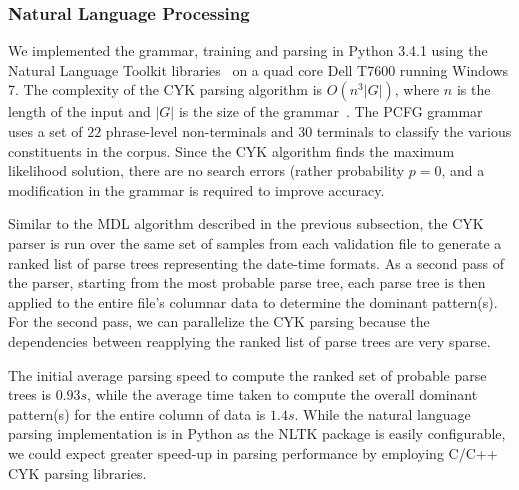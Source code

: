 \subsubsection{Natural Language Processing}
We implemented the grammar, training and parsing in Python 3.4.1 using the Natural Language Toolkit libraries~\cite{nltk} on a quad core Dell T7600 running Windows 7. The complexity of the CYK parsing algorithm is $O(n^{3}|G|)$, where $n$ is the length of the input and $|G|$ is the size of the grammar~\cite{Younger67}. The PCFG grammar uses a set of $22$ phrase-level non-terminals and $30$ terminals to classify the various constituents in the corpus. Since the CYK algorithm finds the maximum likelihood solution, there are no search errors (rather probability $p = 0$, and a modification in the grammar is required to improve accuracy.

Similar to the MDL algorithm described in the previous subsection, the CYK parser is run over the same set of samples from each validation file to generate a ranked list of parse trees representing the date-time formats. As a second pass of the parser, starting from the most probable parse tree, each parse tree is then applied to the entire file's columnar data to determine the dominant pattern(s). For the second pass, we can parallelize the CYK parsing because the dependencies between reapplying the ranked list of parse trees are very sparse.

The initial average parsing speed to compute the ranked set of probable parse trees is $0.93s$, while the average time taken to compute the overall dominant pattern(s) for the entire column of data is $1.4s$. While the natural language parsing implementation is in Python as the NLTK package is easily configurable, we could expect greater speed-up in parsing performance by employing C/C++ CYK parsing libraries.

